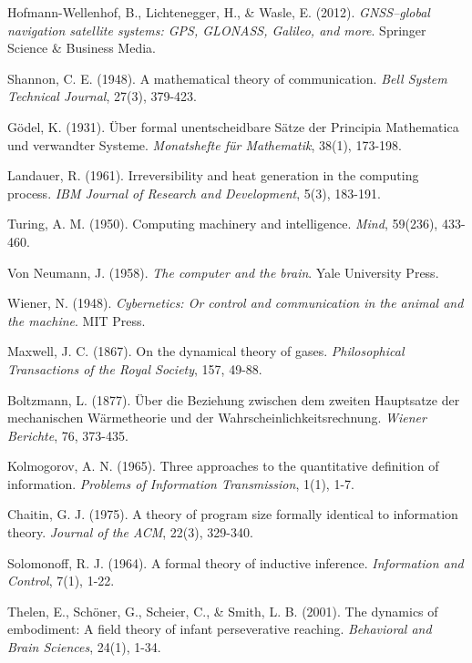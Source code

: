 \documentclass[12pt,a4paper]{article}
\begin{document}
\begin{thebibliography}{99}

Hofmann-Wellenhof, B., Lichtenegger, H., \& Wasle, E. (2012). \textit{GNSS–global navigation satellite systems: GPS, GLONASS, Galileo, and more}. Springer Science \& Business Media.

Shannon, C. E. (1948). A mathematical theory of communication. \textit{Bell System Technical Journal}, 27(3), 379-423.

Gödel, K. (1931). Über formal unentscheidbare Sätze der Principia Mathematica und verwandter Systeme. \textit{Monatshefte für Mathematik}, 38(1), 173-198.

Landauer, R. (1961). Irreversibility and heat generation in the computing process. \textit{IBM Journal of Research and Development}, 5(3), 183-191.

Turing, A. M. (1950). Computing machinery and intelligence. \textit{Mind}, 59(236), 433-460.

Von Neumann, J. (1958). \textit{The computer and the brain}. Yale University Press.

Wiener, N. (1948). \textit{Cybernetics: Or control and communication in the animal and the machine}. MIT Press.

Maxwell, J. C. (1867). On the dynamical theory of gases. \textit{Philosophical Transactions of the Royal Society}, 157, 49-88.

Boltzmann, L. (1877). Über die Beziehung zwischen dem zweiten Hauptsatze der mechanischen Wärmetheorie und der Wahrscheinlichkeitsrechnung. \textit{Wiener Berichte}, 76, 373-435.

Kolmogorov, A. N. (1965). Three approaches to the quantitative definition of information. \textit{Problems of Information Transmission}, 1(1), 1-7.

Chaitin, G. J. (1975). A theory of program size formally identical to information theory. \textit{Journal of the ACM}, 22(3), 329-340.

Solomonoff, R. J. (1964). A formal theory of inductive inference. \textit{Information and Control}, 7(1), 1-22.

Thelen, E., Schöner, G., Scheier, C., \& Smith, L. B. (2001). The dynamics of embodiment: A field theory of infant perseverative reaching. \textit{Behavioral and Brain Sciences}, 24(1), 1-34.


\end{thebibliography}
\end{document}
